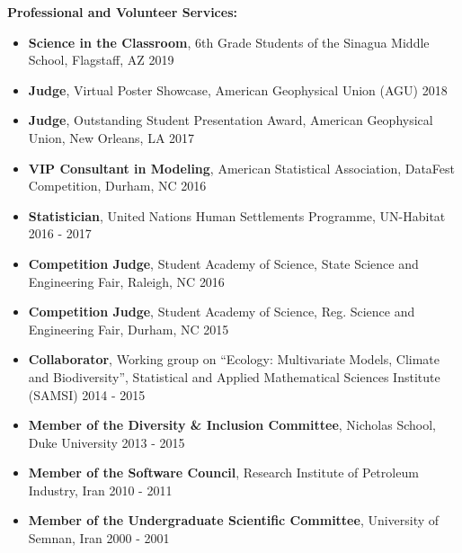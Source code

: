 \documentclass[10pt]{article}
\newenvironment{changemargin}[2]{%
  \begin{list}{}{%
 \setlength{\topsep}{0pt}%
 \setlength{\leftmargin}{#1}%
 \setlength{\rightmargin}{#2}%
 \setlength{\listparindent}{\parindent}%
 \setlength{\itemindent}{\parindent}%
 \setlength{\parsep}{\parskip}%
  }%
  \item[]}{\end{list}
}
\newenvironment{body} {
  \vspace*{-2pt}
  \begin{changemargin}{-0.5in}{-0.5in}
}
{\end{changemargin}
}
\begin{document}
\begin{body}
\begin{itemize}
  \end{itemize}

  \textbf{Professional and Volunteer Services:} \\
  \vspace*{-4pt}
  \begin{itemize} \itemsep -0pt
    \item[] \textbf{Science in the Classroom}, 6th Grade Students of the Sinagua Middle School, Flagstaff, AZ \hfill  {2019}\\
    \item[] \textbf{Judge}, Virtual Poster Showcase, American Geophysical Union (AGU) \hfill  {2018}\\
    \item[] \textbf{Judge}, Outstanding Student Presentation Award, American Geophysical Union, New Orleans, LA \hfill  {2017}\\
    \item[] \textbf{VIP Consultant in Modeling}, American Statistical Association, DataFest Competition, Durham, NC \hfill  {2016}\\
    \item[] \textbf{Statistician}, United Nations Human Settlements Programme, UN-Habitat \hfill  {2016 -  2017}\\
    \item[] \textbf{Competition Judge}, Student Academy of Science, State Science and Engineering Fair, Raleigh, NC \hfill  {2016}\\
    \item[] \textbf{Competition Judge}, Student Academy of Science, Reg. Science and Engineering Fair, Durham, NC \hfill  {2015}\\
    \item[] \textbf{Collaborator}, Working group on ``Ecology: Multivariate Models, Climate and Biodiversity'', Statistical and Applied Mathematical Sciences Institute (SAMSI) \hfill  {2014 - 2015}\\
    \item[] \textbf{Member of the Diversity \& Inclusion Committee}, Nicholas School, Duke University \hfill  {2013 -  2015}\\
    \item[] \textbf{Member of the Software Council}, Research Institute of Petroleum Industry, Iran \hfill  {2010 - 2011}\\
    \item[] \textbf{Member of the Undergraduate Scientific Committee}, University of Semnan, Iran \hfill  {2000 -  2001}\\
  \end{itemize}


\end{body}
\end{document}
